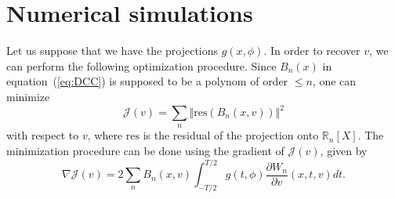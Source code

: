 \documentclass[a4paper]{article}
\numberwithin{equation}{section}
\newcommand{\R}{\mathbb{R}}
\begin{document}
\section{Numerical simulations}

Let us suppose that we have the projections $g(x,\phi)$. In order to recover $v$, we can perform the following optimization procedure. Since $B_n(x)$ in equation~(\ref{eq:DCC}) is supposed to be a polynom of order $\leq n$, one can minimize
\begin{equation}
	\mathcal{J}(v) = \sum_n \Vert \textrm{res} \left( B_n(x,v) \right) \Vert^2
\end{equation}
with respect to $v$, where $\textrm{res}$ is the residual of the projection onto $\R_n[X]$. The minimization procedure can be done using the gradient of $\mathcal{J}(v)$, given by
\begin{equation}
	\nabla \mathcal{J}(v) = 2 \sum_n B_n(x,v) \int_{-T/2}^{T/2} g(t,\phi) \frac{\partial W_n}{\partial v}(x,t,v) dt.
\end{equation}



\end{document}
